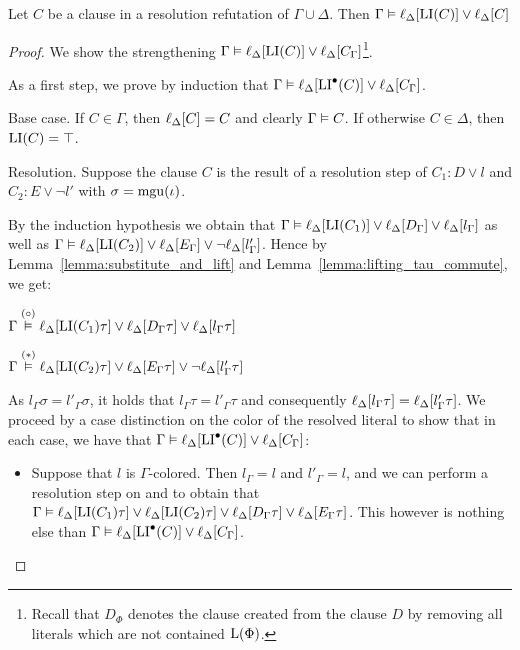 \begin{lemma}
	\label{lemma:gamma_entails_delta_lifted_invariant}
	Let $C$ be a clause in a resolution refutation of $\Gamma \cup \Delta$.
	Then
	$\Gamma \vDash \ell_{\Delta}[ \operatorname{LI}(C) ] \lor \ell_{\Delta}[C] $
\end{lemma}
\begin{proof}
	We show the strengthening
	$\Gamma \vDash \ell_{\Delta}[ \operatorname{LI}(C) ] \lor \ell_{\Delta}[C_\Gamma]$\footnote{Recall that $D_\Phi$ denotes the clause created from the clause $D$ by removing all literals which are not contained $\operatorname{L}(\Phi)$.}.

	As a first step, 
	we prove by induction that
	$\Gamma \vDash \ell_{\Delta}[ \operatorname{LI}^\bullet(C) ] \lor \ell_{\Delta}[C_\Gamma]$.


	\begin{description}
		\item{} Base case.
			If $C\in \Gamma$, then $\ell_{\Delta}[C] = C$ and clearly $\Gamma \vDash C$.
			If otherwise $C \in \Delta$, then $\operatorname{LI}(C) = \top$.

		\item{} Resolution.
			Suppose the clause $C$ is the result of a resolution step \inference{} of $C_1: D \lor l$ and $C_2: E \lor \lnot l'$ with $\sigma = \operatorname{mgu}(\iota)$.

			By the induction hypothesis we obtain that
			$\Gamma \vDash \ell_{\Delta}[\operatorname{LI}(C_1)] \lor \ell_{\Delta}[D_\Gamma] \lor \ell_{\Delta}[l_\Gamma]$
			as well as 
			$\Gamma \vDash \ell_{\Delta}[\operatorname{LI}(C_2)] \lor \ell_{\Delta}[E_\Gamma] \lor \lnot \ell_{\Delta}[l'_\Gamma]$.
			Hence by Lemma~\ref{lemma:substitute_and_lift} and Lemma~\ref{lemma:lifting_tau_commute}, we get:

			$\Gamma \stackrel{(\circ)}{\vDash} \ell_{\Delta}[\operatorname{LI}(C_1)\tau] \lor \ell_{\Delta}[D_\Gamma\tau] \lor \ell_{\Delta}[l_\Gamma\tau]$

			$\Gamma \stackrel{(*)}{\vDash} \ell_{\Delta}[\operatorname{LI}(C_2)\tau] \lor \ell_{\Delta}[E_\Gamma\tau] \lor \lnot \ell_{\Delta}[l'_\Gamma\tau]$

			As $l_\Gamma\sigma = l'_\Gamma\sigma$,
			it holds that $l_\Gamma\tau = l'_\Gamma\tau$ and consequently 
			$\ell_{\Delta}[l_\Gamma\tau] = \ell_{\Delta}[l'_\Gamma\tau]$.
			We proceed by a case distinction on the color of the resolved literal to show that in each case, we have that
			$\Gamma \vDash \ell_{\Delta}[\operatorname{LI}^\bullet(C)] \lor \ell_{\Delta}[C_\Gamma]$:
			\begin{itemize}
				\item Suppose that $l$ is $\Gamma$-colored.
					Then $l_\Gamma = l$ and $l'_\Gamma = l$, and we can perform a resolution step on \markA{} and \markB{} to obtain that
					$\Gamma \vDash
					\ell_{\Delta}[\operatorname{LI}(C_1)\tau] \lor
					\ell_{\Delta}[\operatorname{LI}(C_2)\tau] \lor 
					\ell_{\Delta}[D_\Gamma\tau]  \lor
					\ell_{\Delta}[E_\Gamma\tau]$.
					This however is nothing else than $\Gamma \vDash \ell_{\Delta}[\operatorname{LI}^\bullet(C)] \lor \ell_{\Delta}[C_\Gamma]$.


\end{itemize}
\end{description}
\end{proof}
